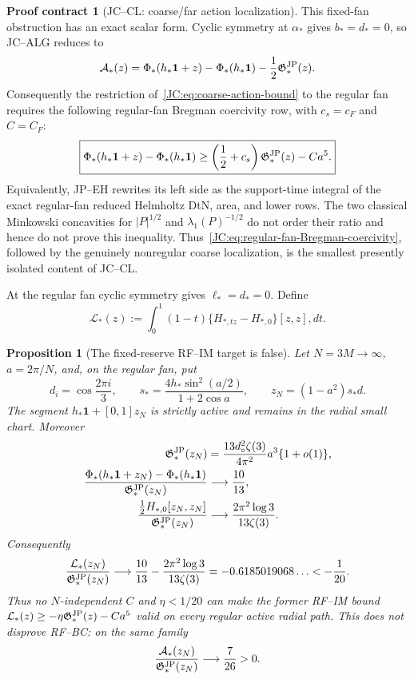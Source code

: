 \documentclass[11pt]{amsart}
\providecommand{\mathscr}{\mathcal}
\numberwithin{equation}{section}
\newtheorem{proposition}[theorem]{Proposition}
\theoremstyle{definition}
\newtheorem{contract}[theorem]{Proof contract}
\theoremstyle{remark}
\newcommand{\Gjp}{\mathfrak G^{\rm JP}}
\providecommand{\mathscr}[1]{\mathcal{#1}}
\begin{document}
\begin{contract}[JC--CL: coarse/far action localization]
This fixed-fan obstruction has an exact scalar form.  Cyclic symmetry at
$\alpha_*$ gives $b_*=d_*=0$, so JC--ALG reduces to
\[
 \mathscr A_*(z)=
 \Phi_*(h_*\mathbf1+z)-\Phi_*(h_*\mathbf1)
 -\frac12\Gjp_*(z).
\]
Consequently the restriction of~\eqref{JC:eq:coarse-action-bound} to the
regular fan requires the following regular-fan Bregman coercivity row,
with $c_s=c_F$ and $C=C_F$:
\begin{equation}\label{JC:eq:regular-fan-Bregman-coercivity}
 \boxed{
 \Phi_*(h_*\mathbf1+z)-\Phi_*(h_*\mathbf1)
 \ge\left(\frac12+c_s\right)\Gjp_*(z)-Ca^5.}
\end{equation}
Equivalently, JP--EH rewrites its left side as the support-time integral
of the exact regular-fan reduced Helmholtz DtN, area, and lower rows.  The
two classical Minkowski concavities for $|P|^{1/2}$ and
$\lambda_1(P)^{-1/2}$ do not order their ratio and hence do not prove this
inequality.  Thus~\eqref{JC:eq:regular-fan-Bregman-coercivity}, followed by
the genuinely nonregular coarse localization, is the smallest presently
isolated content of JC--CL.

At the regular fan cyclic symmetry gives $\ell_*=d_*=0$.  Define
\begin{equation}\label{JC:eq:regular-fan-integrated-modulus}
 \mathcal L_*(z):=\int_0^1(1-t)
 \{H_{*,tz}-H_{*,0}\}[z,z],dt.
\end{equation}

\begin{proposition}[The fixed-reserve RF--IM target is false]
\label{JC:prop:RF-IM-period-three-counterexample}
Let \(N=3M\to\infty\), \(a=2\pi/N\), and, on the regular fan, put
\[
 d_i=\cos\frac{2\pi i}{3},\qquad
 s_*=\frac{4h_*\sin^2(a/2)}{1+2\cos a},\qquad
 z_N=(1-a^2)s_*d.
\]
The segment \(h_*\mathbf1+[0,1]z_N\) is strictly active and remains in
the radial small chart.  Moreover
\begin{align}
 \Gjp_*(z_N)
 &=\frac{13d_\circ^2\zeta(3)}{4\pi^2}a^3\{1+o(1)\},
 \label{JC:eq:RF-counterexample-G}\\
 \frac{\Phi_*(h_*\mathbf1+z_N)-\Phi_*(h_*\mathbf1)}
 {\Gjp_*(z_N)}
 &\longrightarrow\frac{10}{13},
 \label{JC:eq:RF-counterexample-value}\\
 \frac{\frac12H_{*,0}[z_N,z_N]}{\Gjp_*(z_N)}
 &\longrightarrow\frac{2\pi^2\log3}{13\zeta(3)}.
 \label{JC:eq:RF-counterexample-root}
\end{align}
Consequently
\begin{equation}\label{JC:eq:regular-fan-integrated-modulus-disproved}
 \frac{\mathcal L_*(z_N)}{\Gjp_*(z_N)}
 \longrightarrow
 \frac{10}{13}-\frac{2\pi^2\log3}{13\zeta(3)}
 =-0.6185019068\ldots<-\frac1{20}.
\end{equation}
Thus no \(N\)-independent \(C\) and \(\eta<1/20\) can make the former
RF--IM bound
\(\mathcal L_*(z)\ge-\eta\Gjp_*(z)-Ca^5\) valid on every regular active
radial path.  This does not disprove RF--BC: on the same family
\begin{equation}\label{JC:eq:RF-counterexample-action}
 \frac{\mathscr A_*(z_N)}{\Gjp_*(z_N)}
 \longrightarrow\frac7{26}>0.
\end{equation}
\end{proposition}


\end{contract}
\end{document}
